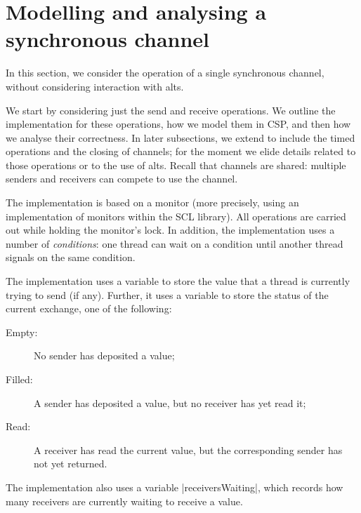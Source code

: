 \section{Modelling and analysing a  synchronous channel}
\label{sec:syncchan}

\inlineScala

In this section, we consider the operation of a single synchronous channel,
without considering interaction with alts.

We start by considering just the send and receive operations.  We outline the
implementation for these operations, how we model them in CSP, and then how we
analyse their correctness.  In later subsections, we extend to include the
timed operations and the closing of channels; for the moment we elide details
related to those operations or to the use of alts.  Recall that channels are
shared: multiple senders and receivers can compete to use the channel. 

The implementation is based on a monitor (more precisely, using an
implementation of monitors within the SCL library).  All operations are
carried out while holding the monitor's lock.  In addition, the implementation
uses a number of \emph{conditions}: one thread can wait on a condition until
another thread signals on the same condition.

The implementation uses a variable  to store the value that a
thread is currently trying to send (if any).  Further, it uses a variable
 to store the status of the current exchange, one of the
following: 
\begin{description}
\item[{\scalastyle Empty}:] No sender has deposited a value;
\item[{\scalastyle Filled}:] A sender has deposited a value, but no receiver
  has yet read it;
\item[{\scalastyle Read}:] A receiver has read the current value, but the
  corresponding sender has not yet returned.
\end{description}
%
The implementation also uses a variable |receiversWaiting|, which records how
many receivers are currently waiting to receive a value. 



